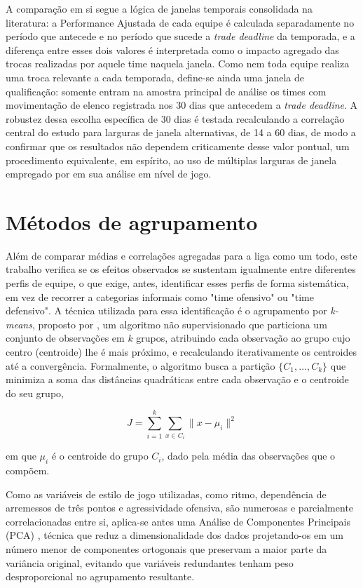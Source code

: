 A comparação em si segue a lógica de janelas temporais consolidada na literatura: a Performance Ajustada de cada equipe é calculada separadamente no período que antecede e no período que sucede a \textit{trade deadline} da temporada, e a diferença entre esses dois valores é interpretada como o impacto agregado das trocas realizadas por aquele time naquela janela. Como nem toda equipe realiza uma troca relevante a cada temporada, define-se ainda uma janela de qualificação: somente entram na amostra principal de análise os times com movimentação de elenco registrada nos 30 dias que antecedem a \textit{trade deadline}. A robustez dessa escolha específica de 30 dias é testada recalculando a correlação central do estudo para larguras de janela alternativas, de 14 a 60 dias, de modo a confirmar que os resultados não dependem criticamente desse valor pontual, um procedimento equivalente, em espírito, ao uso de múltiplas larguras de janela empregado por \citet{katayama2011} em sua análise em nível de jogo.

\section{Métodos de agrupamento}
\label{sec:clustering}

Além de comparar médias e correlações agregadas para a liga como um todo, este trabalho verifica se os efeitos observados se sustentam igualmente entre diferentes perfis de equipe, o que exige, antes, identificar esses perfis de forma sistemática, em vez de recorrer a categorias informais como "time ofensivo" ou "time defensivo". A técnica utilizada para essa identificação é o agrupamento por \textit{k-means}, proposto por \citet{macqueen1967}, um algoritmo não supervisionado que particiona um conjunto de observações em $k$ grupos, atribuindo cada observação ao grupo cujo centro (centroide) lhe é mais próximo, e recalculando iterativamente os centroides até a convergência. Formalmente, o algoritmo busca a partição $\{C_1, \ldots, C_k\}$ que minimiza a soma das distâncias quadráticas entre cada observação e o centroide do seu grupo,

\begin{equation}
J = \sum_{i=1}^{k} \sum_{x \in C_i} \lVert x - \mu_i \rVert^2
\label{eq:kmeans}
\end{equation}

em que $\mu_i$ é o centroide do grupo $C_i$, dado pela média das observações que o compõem.

Como as variáveis de estilo de jogo utilizadas, como ritmo, dependência de arremessos de três pontos e agressividade ofensiva, são numerosas e parcialmente correlacionadas entre si, aplica-se antes uma Análise de Componentes Principais (PCA) \citep{jolliffe2002}, técnica que reduz a dimensionalidade dos dados projetando-os em um número menor de componentes ortogonais que preservam a maior parte da variância original, evitando que variáveis redundantes tenham peso desproporcional no agrupamento resultante.

